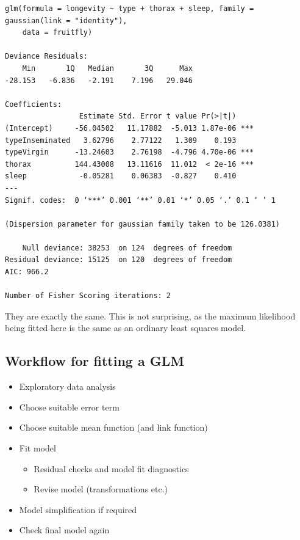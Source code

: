 \documentclass[
]{book}
\providecommand{\tightlist}{%
  \setlength{\itemsep}{0pt}\setlength{\parskip}{0pt}}
\begin{document}
\begin{verbatim}
glm(formula = longevity ~ type + thorax + sleep, family = gaussian(link = "identity"), 
    data = fruitfly)

Deviance Residuals: 
    Min       1Q   Median       3Q      Max  
-28.153   -6.836   -2.191    7.196   29.046  

Coefficients:
                 Estimate Std. Error t value Pr(>|t|)    
(Intercept)     -56.04502   11.17882  -5.013 1.87e-06 ***
typeInseminated   3.62796    2.77122   1.309    0.193    
typeVirgin      -13.24603    2.76198  -4.796 4.70e-06 ***
thorax          144.43008   13.11616  11.012  < 2e-16 ***
sleep            -0.05281    0.06383  -0.827    0.410    
---
Signif. codes:  0 ‘***’ 0.001 ‘**’ 0.01 ‘*’ 0.05 ‘.’ 0.1 ‘ ’ 1

(Dispersion parameter for gaussian family taken to be 126.0381)

    Null deviance: 38253  on 124  degrees of freedom
Residual deviance: 15125  on 120  degrees of freedom
AIC: 966.2

Number of Fisher Scoring iterations: 2
\end{verbatim}

They are exactly the same. This is not surprising, as the maximum likelihood being fitted here is the same as an ordinary least squares model.

\hypertarget{workflow-for-fitting-a-glm}{%
\subsection{Workflow for fitting a GLM}\label{workflow-for-fitting-a-glm}}

\begin{itemize}
\tightlist
\item
  Exploratory data analysis
\item
  Choose suitable error term
\item
  Choose suitable mean function (and link function)
\item
  Fit model

  \begin{itemize}
  \tightlist
  \item
    Residual checks and model fit diagnostics
  \item
    Revise model (transformations etc.)
  \end{itemize}
\item
  Model simplification if required
\item
  Check final model again
\end{itemize}
\end{document}
